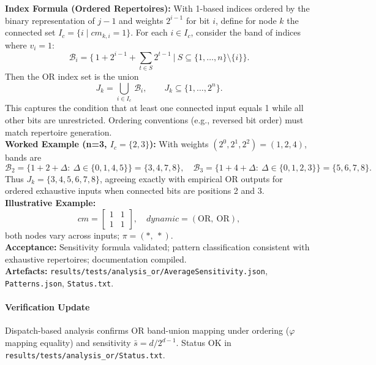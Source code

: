 \documentclass{article}
\begin{document}
\textbf{Index Formula (Ordered Repertoires):} With 1-based indices ordered by the binary representation of \(j-1\) and weights \(2^{i-1}\) for bit \(i\), define for node \(k\) the connected set \(I_c=\{i\mid cm_{k,i}=1\}\). For each \(i\in I_c\), consider the band of indices where \(v_i=1\):
\[
\mathcal{B}_i=\Big\{\,1+2^{i-1}+\sum_{t\in S}2^{t-1}\ \Big|\ S\subseteq\{1,\dots,n\}\setminus\{i\}\Big\}.
\]
Then the OR index set is the union
\[
J_k=\bigcup_{i\in I_c}\,\mathcal{B}_i,\qquad J_k\subseteq\{1,\dots,2^n\}.
\]
This captures the condition that at least one connected input equals 1 while all other bits are unrestricted. Ordering conventions (e.g., reversed bit order) must match repertoire generation.\\
\textbf{Worked Example (n=3, \(I_c=\{2,3\}\)):} With weights \((2^{0},2^{1},2^{2})=(1,2,4)\), bands are
\[
\mathcal{B}_2=\{1+2+\Delta:\ \Delta\in\{0,1,4,5\}\}=\{3,4,7,8\},\quad \mathcal{B}_3=\{1+4+\Delta:\ \Delta\in\{0,1,2,3\}\}=\{5,6,7,8\}.
\]
Thus \(J_k=\{3,4,5,6,7,8\}\), agreeing exactly with empirical OR outputs for ordered exhaustive inputs when connected bits are positions 2 and 3.
\textbf{Illustrative Example:}
\[
cm = \begin{bmatrix}1 & 1\\ 1 & 1\end{bmatrix},\quad dynamic=(\text{OR},\ \text{OR}),
\]
both nodes vary across inputs; \(\pi=(*,\ *)\).\\
\textbf{Acceptance:} Sensitivity formula validated; pattern classification consistent with exhaustive repertoires; documentation compiled.\\
\textbf{Artefacts:} \texttt{results/tests/analysis\_or/AverageSensitivity.json}, \texttt{Patterns.json}, \texttt{Status.txt}.
\paragraph{Verification Update} Dispatch-based analysis confirms OR band-union mapping under ordering (\(\varphi\) mapping equality) and sensitivity \(\bar{s}=d/2^{d-1}\). Status OK in \texttt{results/tests/analysis\_or/Status.txt}.
\end{document}
